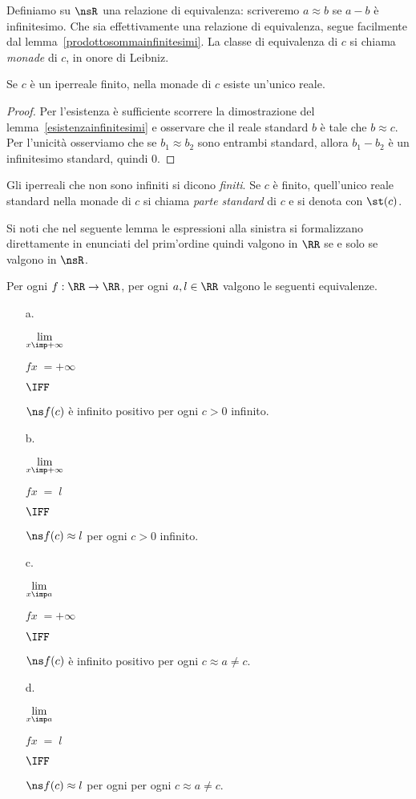 Definiamo su $\nsR$ una relazione di equivalenza: scriveremo $a\approx b$ se $a-b$ \`e infinitesimo. Che sia effettivamente una relazione di equivalenza, segue facilmente dal lemma~\ref{prodottosommainfinitesimi}. La classe di equivalenza di $c$ si chiama \emph{monade\/} di $c$, in onore di Leibniz.

\begin{lemma}
Se $c$ \`e un iperreale finito, nella monade di $c$ esiste un'unico reale.
\end{lemma}
\begin{proof}
Per l'esistenza \`e sufficiente scorrere la dimostrazione del lemma~\ref{esistenzainfinitesimi} e osservare che il reale standard $b$ \`e tale che $b\approx c$. Per l'unicit\`a osserviamo che se $b_1\approx b_2$ sono entrambi standard, allora $b_1-b_2$ \`e un infinitesimo standard, quindi $0$.  
\end{proof}

Gli iperreali che non sono infiniti si dicono \emph{finiti}. Se $c$ \`e finito, quell'unico reale standard nella monade di $c$ si chiama \emph{parte standard\/} di $c$ e si denota con \emph{$\st(c)$}.

Si noti che nel seguente lemma le espressioni alla sinistra si formalizzano direttamente in enunciati del prim'ordine quindi valgono in $\RR$ se e solo se valgono in $\nsR$.

\begin{proposition}\label{fattolimitinonstandard}
Per ogni $f:\RR\to\RR$, per ogni $a, l\in\RR$ valgono le seguenti equivalenze.
\begin{itemize}
\item[a.]\ \parbox{6ex}{$\displaystyle\lim_{x\imp+\infty}$}\parbox{8ex}{$fx\;=+\infty$}\parbox{12ex}{\hfil$\IFF$}$\ns f(c)$ \`e infinito positivo per ogni $c>0$ infinito.

\item[b.]\ \parbox{6ex}{$\displaystyle\lim_{x\imp+\infty}$}\parbox{8ex}{$fx\;=\;l$}\parbox{12ex}{\hfil$\IFF$}$\ns f(c)\approx l$ per ogni $c>0$ infinito.

\item[c.]\ \parbox{6ex}{$\displaystyle\lim_{x\imp a}$}\parbox{8ex}{$fx\;=+\infty$}\parbox{12ex}{\hfil$\IFF$}$\ns f(c)$ \`e infinito positivo per ogni $c\approx a\neq c$.

\item[d.]\ \parbox{6ex}{$\displaystyle\lim_{x\imp a}$}\parbox{8ex}{$fx\;=\;l$}\parbox{12ex}{\hfil$\IFF$}$\ns f(c)\approx l$ per ogni per ogni $c\approx a\neq c$.
\end{itemize}
\end{proposition}

